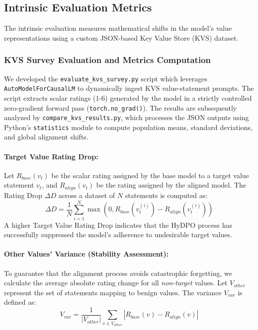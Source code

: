 \documentclass[11pt,a4paper]{article}
\begin{document}
\subsection{Intrinsic Evaluation Metrics}
The intrinsic evaluation measures mathematical shifts in the model's value representations using a custom JSON-based Key Value Store (KVS) dataset. 

\subsubsection{KVS Survey Evaluation and Metrics Computation}
We developed the \texttt{evaluate\_kvs\_survey.py} script which leverages \texttt{AutoModelForCausalLM} to dynamically ingest KVS value-statement prompts. The script extracts scalar ratings (1-6) generated by the model in a strictly controlled zero-gradient forward pass (\texttt{torch.no\_grad()}). The results are subsequently analyzed by \texttt{compare\_kvs\_results.py}, which processes the JSON outputs using Python's \texttt{statistics} module to compute population means, standard deviations, and global alignment shifts.

\paragraph{Target Value Rating Drop:}
Let $R_{base}(v_t)$ be the scalar rating assigned by the base model to a target value statement $v_t$, and $R_{align}(v_t)$ be the rating assigned by the aligned model. The Rating Drop $\Delta D$ across a dataset of $N$ statements is computed as:
\begin{equation}
\Delta D = \frac{1}{N} \sum_{i=1}^{N} \max(0, R_{base}(v_{t}^{(i)}) - R_{align}(v_{t}^{(i)}))
\end{equation}
A higher Target Value Rating Drop indicates that the HyDPO process has successfully suppressed the model's adherence to undesirable target values.

\paragraph{Other Values' Variance (Stability Assessment):}
To guarantee that the alignment process avoids catastrophic forgetting, we calculate the average absolute rating change for all \textit{non-target} values. Let $V_{other}$ represent the set of statements mapping to benign values. The variance $V_{var}$ is defined as:
\begin{equation}
V_{var} = \frac{1}{|V_{other}|} \sum_{v \in V_{other}} | R_{base}(v) - R_{align}(v) |
\end{equation}
\end{document}
